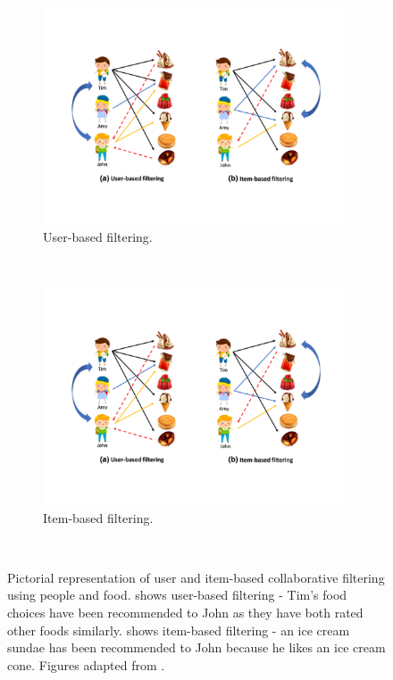 \documentclass{l4proj}
\begin{document}
\begin{figure}[htb] 
    \centering
    \begin{subfigure}[b]{0.42\textwidth}
        \includegraphics[width=\textwidth]{images/user_based_filtering.pdf}
        \caption{User-based filtering.}
        \label{fig:user_based_filtering}
    \end{subfigure}
    ~
    \begin{subfigure}[b]{0.42\textwidth}
        \includegraphics[width=\textwidth]{images/item_based_filtering.pdf}
        \caption{Item-based filtering.}
        \label{fig:item_based_filtering}
    \end{subfigure}
    ~
    \caption{Pictorial representation of user and item-based collaborative filtering using people and food.  shows user-based filtering - Tim's food choices have been recommended to John as they have both rated other foods similarly.  shows item-based filtering - an ice cream sundae has been recommended to John because he likes an ice cream cone. Figures adapted from \cite{uservsitemfiltering}.}
    \label{fig:collaborative_filtering}
\end{figure}
\end{document}
